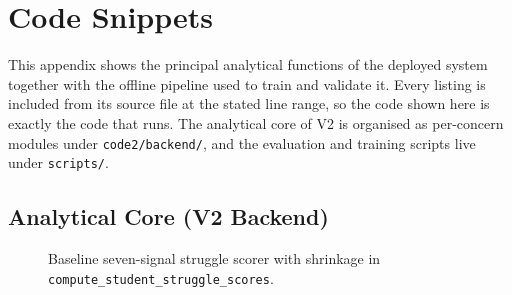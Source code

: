 \section{Code Snippets}
\label{app:code}

This appendix shows the principal analytical functions of the deployed system together with the offline pipeline used to train and validate it. Every listing is included from its source file at the stated line range, so the code shown here is exactly the code that runs. The analytical core of V2 is organised as per-concern modules under \texttt{code2/backend/}, and the evaluation and training scripts live under \texttt{scripts/}.


\subsection{Analytical Core (V2 Backend)}

\begin{figure}[H]

\caption{Baseline seven-signal struggle scorer with shrinkage in \texttt{compute\_student\_struggle\_scores}.}
\label{fig:appx-struggle}
\end{figure}

